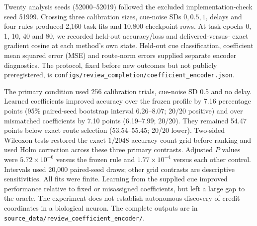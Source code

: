 Twenty analysis seeds (52000--52019) followed the excluded implementation-check
seed 51999.
Crossing three calibration sizes, cue-noise SDs $0,0.5,1$, delays and four
rules produced 2,160 task fits and 10,800 checkpoint rows. At task epochs
0, 1, 10, 40 and 80, we recorded held-out accuracy/loss and delivered-versus-
exact gradient cosine at each method's own state. Held-out cue classification,
coefficient mean squared error (MSE) and route-norm errors supplied separate
encoder diagnostics.
The protocol, fixed before new outcomes but not publicly preregistered, is
\texttt{configs/review\_completion/coefficient\_encoder.json}.

The primary condition used 256 calibration trials, cue-noise SD 0.5 and no
delay. Learned coefficients improved accuracy over the frozen profile by
7.16 percentage points (95\% paired-seed bootstrap interval 6.26--8.07;
20/20 positive) and over mismatched coefficients by 7.10 points
(6.19--7.99; 20/20). They remained 54.47 points below exact route selection
(53.54--55.45; 20/20 lower). Two-sided Wilcoxon tests restored the exact
$1/2048$ accuracy-count grid before ranking and used Holm correction across
these three primary contrasts. Adjusted $P$ values were
$5.72\times10^{-6}$ versus the frozen rule and
$1.77\times10^{-4}$ versus each other control. Intervals used 20,000
paired-seed draws; other grid contrasts are descriptive sensitivities.
All fits were finite. Learning from the supplied cue improved performance
relative to fixed or misassigned coefficients, but left a large gap to the
oracle. The experiment does not establish autonomous discovery of credit
coordinates in a biological neuron. The complete outputs are in
\texttt{source\_data/review\_coefficient\_encoder/}.

